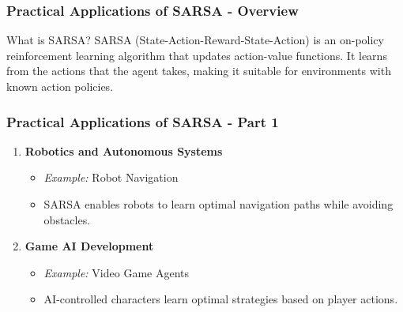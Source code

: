 \documentclass{beamer}
\begin{document}
\begin{frame}[fragile]
    \frametitle{Practical Applications of SARSA - Overview}
    \begin{block}{What is SARSA?}
        SARSA (State-Action-Reward-State-Action) is an on-policy reinforcement learning algorithm that updates action-value functions. It learns from the actions that the agent takes, making it suitable for environments with known action policies.
    \end{block}
\end{frame}

\begin{frame}[fragile]
    \frametitle{Practical Applications of SARSA - Part 1}
    \begin{enumerate}
        \item \textbf{Robotics and Autonomous Systems}  
            \begin{itemize}
                \item \textit{Example:} Robot Navigation
                \item SARSA enables robots to learn optimal navigation paths while avoiding obstacles.
            \end{itemize}
        
        \item \textbf{Game AI Development}  
            \begin{itemize}
                \item \textit{Example:} Video Game Agents
                \item AI-controlled characters learn optimal strategies based on player actions.
            \end{itemize}
    \end{enumerate}
\end{frame}
\end{document}
